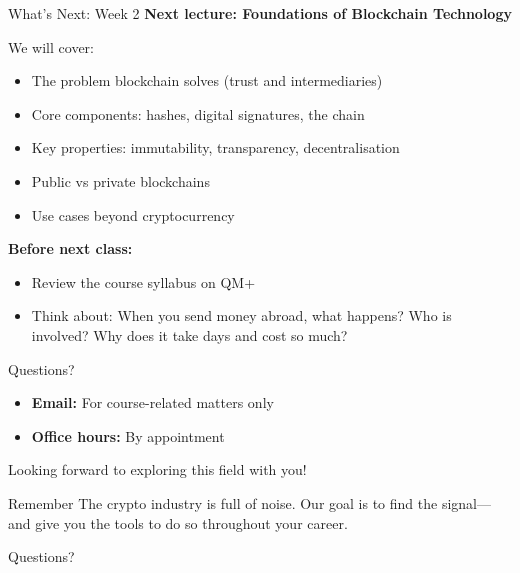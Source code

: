 \documentclass[10pt]{beamer}
\begin{document}
\begin{frame}{What's Next: Week 2}
  \textbf{Next lecture: Foundations of Blockchain Technology}
  
  \vspace{1em}
  We will cover:
  \begin{itemize}
    \item The problem blockchain solves (trust and intermediaries)
    \item Core components: hashes, digital signatures, the chain
    \item Key properties: immutability, transparency, decentralisation
    \item Public vs private blockchains
    \item Use cases beyond cryptocurrency
  \end{itemize}
  
  \vspace{1em}
  \textbf{Before next class:}
  \begin{itemize}
    \item Review the course syllabus on QM+
    \item Think about: When you send money abroad, what happens? Who is involved? Why does it take days and cost so much?
  \end{itemize}
\end{frame}

\begin{frame}{Questions?}
  \begin{itemize}
    \item \textbf{Email:} For course-related matters only
    
    \vspace{0.5em}
    \item \textbf{Office hours:} By appointment
  \end{itemize}
  
  \vspace{2em}
  \begin{center}
    \Large Looking forward to exploring this field with you!
  \end{center}
  
  \vspace{2em}
  \begin{block}{Remember}
    The crypto industry is full of noise. Our goal is to find the signal---and give you the tools to do so throughout your career.
  \end{block}
\end{frame}

\begin{frame}[plain]
  \centering
  \vfill
  {\Large Questions?}
  \vfill
\end{frame}
\end{document}
